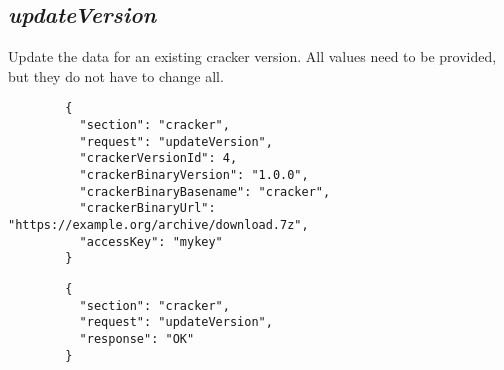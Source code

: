 \subsection*{\textit{updateVersion}}
	Update the data for an existing cracker version. All values need to be provided, but they do not have to change all.
	{
		\color{blue}
		\begin{verbatim}
		{
		  "section": "cracker",
		  "request": "updateVersion",
		  "crackerVersionId": 4,
		  "crackerBinaryVersion": "1.0.0",
		  "crackerBinaryBasename": "cracker",
		  "crackerBinaryUrl": "https://example.org/archive/download.7z",
		  "accessKey": "mykey"
		}
		\end{verbatim}
	}
	{
		\color{OliveGreen}
		\begin{verbatim}
		{
		  "section": "cracker",
		  "request": "updateVersion",
		  "response": "OK"
		}
		\end{verbatim}
	}







